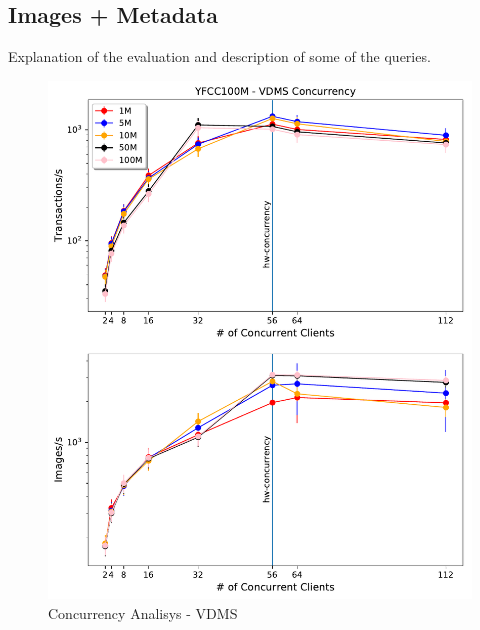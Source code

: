 \subsection{Images + Metadata}

Explanation of the evaluation and description of some of the queries.

\begin{figure}[]
\centering
\includegraphics[width=\columnwidth]{figures/concurrency_vdms}
\caption{Concurrency Analisys - VDMS}
\label{fig:concurrency_vdms}
\end{figure}

